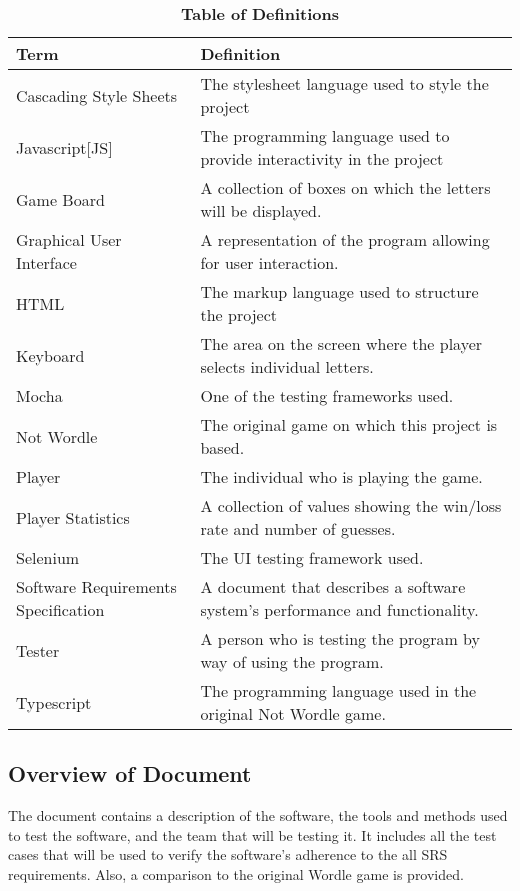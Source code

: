 \documentclass[12pt, titlepage]{article}
\begin{document}
\begin{table}[!htbp]
	\caption{\textbf{Table of Definitions}} \label{Table}
	
	\begin{tabularx}{\textwidth}{p{3cm}X}
		\toprule
		\textbf{Term} & \textbf{Definition}\\
		\midrule
		Cascading Style Sheets & The stylesheet language used to style the 
		project\\
		\hline
		Javascript[JS] & The programming language used to provide interactivity 
		in the 
		project\\
		\hline
		Game Board & A collection of boxes on which the letters will be 
		displayed.\\
		\hline
		Graphical User Interface &  A representation of the program allowing 
		for user 
		interaction.\\
		\hline
		HTML & The markup language used to structure the project\\
		\hline
		Keyboard & The area on the screen where the player selects individual 
		letters.\\
		\hline
		Mocha & One of the testing frameworks used.\\
		\hline
		Not Wordle & The original game on which this project is based.\\
		\hline
		Player & The individual who is playing the game.\\
		\hline
		Player Statistics & A collection of values showing the win/loss rate 
		and number 
		of guesses.\\
		\hline
		Selenium & The UI testing framework used.\\
		\hline
		Software Requirements Specification & A document that describes a 
		software 
		system's performance and functionality.\\
		\hline
		Tester & A person who is testing the program by way of using the 
		program.\\
		\hline
		Typescript & The programming language used in the original Not Wordle 
		game.\\
		
		\bottomrule
	\end{tabularx}
	
\end{table}	

\subsection{Overview of Document}
The document contains a description of the software, the tools and methods used 
to test the software, and the team that will be testing it. It includes 
all the test cases that will be used to verify the software's adherence to the 
all SRS requirements. Also, a comparison to the original Wordle game is 
provided.
\end{document}
